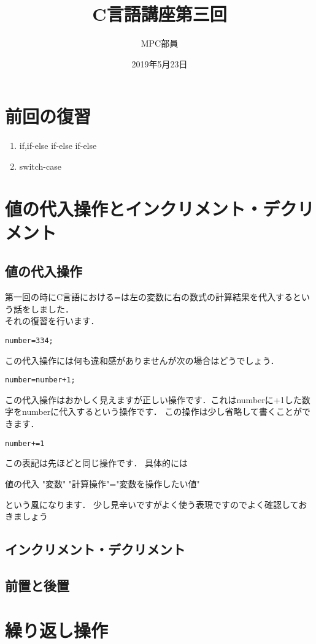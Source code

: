 \documentclass[a4j,titlepage,dvipdfmx]{jsarticle}   %
\title{C言語講座第三回}
\author{MPC部員}
\date{2019年5月23日}
\begin{document}
\maketitle
\section{前回の復習}
\begin{enumerate}
\item if,if-else if-else if-else
\item switch-case
\end{enumerate}
\section{値の代入操作とインクリメント・デクリメント}
\subsection{値の代入操作}
第一回の時にC言語における=は左の変数に右の数式の計算結果を代入するという話をしました．\\
それの復習を行います．
\begin{lstlisting}
number=334;
\end{lstlisting}
この代入操作には何も違和感がありませんが次の場合はどうでしょう．
\begin{lstlisting}
number=number+1;
\end{lstlisting}
この代入操作はおかしく見えますが正しい操作です．これはnumberに+1した数字をnumberに代入するという操作です．
この操作は少し省略して書くことができます．

\begin{lstlisting}
number+=1
\end{lstlisting}
この表記は先ほどと同じ操作です．
具体的には
\begin{itembox}{値の代入}
"変数" "計算操作"="変数を操作したい値"
\end{itembox}
という風になります．
少し見辛いですがよく使う表現ですのでよく確認しておきましょう

\subsection{インクリメント・デクリメント}
\subsection{前置と後置}
\section{繰り返し操作}
\end{document}
